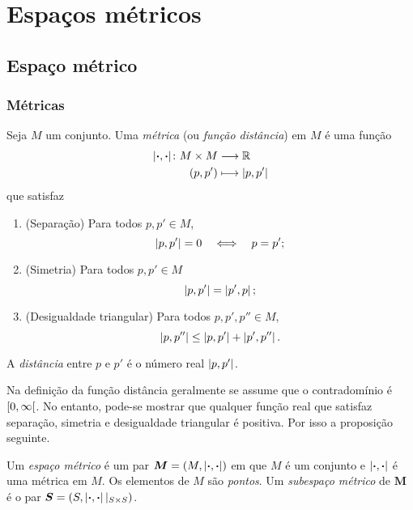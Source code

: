 \chapter{Espaços métricos}

\section{Espaço métrico}

\subsection{Métricas}

\begin{definition}
Seja $M$ um conjunto. Uma \emph{métrica} (ou \emph{função distância}) em $M$ é uma função
	\begin{align*}
	{\left\vert{\bm{\cdot}},{\bm{\cdot}}\right\vert}\colon {M \times M} &\longrightarrow {\mathbb{R}} \\{(p,p')} &\longmapsto \left\vert{p},{p'}\right\vert
	\end{align*}
que satisfaz
	\begin{enumerate}
	\item (Separação) Para todos $p,p' \in M$,
		\begin{equation*}
		\left\vert{p},{p'}\right\vert = 0 \quad \Longleftrightarrow \quad p = p';
		\end{equation*}
	\item (Simetria) Para todos $p,p' \in M$
		\begin{equation*}
		\left\vert{p},{p'}\right\vert = \left\vert{p'},{p}\right\vert;
		\end{equation*}
	\item (Desigualdade triangular) Para todos $p,p',p'' \in M$,
		\begin{equation*}
		\left\vert{p},{p''}\right\vert \leq \left\vert{p},{p'}\right\vert + \left\vert{p'},{p''}\right\vert.
		\end{equation*}
	\end{enumerate}
A \emph{distância} entre $p$ e $p'$ é o número real $\left\vert{p},{p'}\right\vert$.
\end{definition}

Na definição da função distância geralmente se assume que o contradomínio é $\left[{0},{\infty}\right[$. No entanto, pode-se mostrar que qualquer função real que satisfaz separação, simetria e desigualdade triangular é positiva. Por isso a proposição seguinte.

\begin{definition}
Um \emph{espaço métrico} é um par $\bm M = (M,\left\vert{\bm{\cdot}},{\bm{\cdot}}\right\vert)$ em que $M$ é um conjunto e $\left\vert{\bm{\cdot}},{\bm{\cdot}}\right\vert$ é uma métrica em $M$. Os elementos de $M$ são \emph{pontos}. Um \emph{subespaço métrico} de $\bm M$ é o par $\bm S=(S,\left\vert{\bm{\cdot}},{\bm{\cdot}}\right\vert|_{S \times S})$.
\end{definition}

